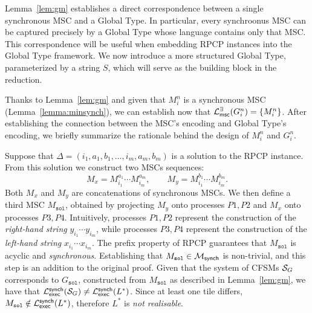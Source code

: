 Lemma~\ref{lem:gm} establishes a direct correspondence between a  
single synchronous MSC and a Global Type. In particular, every  
synchroonus MSC can be captured precisely by a Global Type whose  
language contains only that MSC. This correspondence will be useful  
when embedding RPCP instances into the Global Type framework.
We now introduce a more structured Global Type, parameterized by a  
string $S$, which will serve as the building block in the reduction.

Thanks to Lemma~\ref{lem:gm} and given that $M_i^n$
is a synchronous MSC (Lemma~\ref{lemma:minsynch}), 
we can establish now that 
$\mathcal{L}_{\mathsf{msc}}^{\exists}(G_i^n) =\{M_i^n\}$.
After establishing the connection between the MSC's encoding and
Global Type's encoding,
we briefly summarize the rationale behind the design of $M_i^n$ and $G_i^n$.

Suppose that $\Delta=(i_1,a_1,b_1,\ldots,i_m,a_m,b_m)$ is a  
solution to the RPCP instance. From this solution we construct   
two MSCs sequences:
\[
M_x = M^{a_1}_{i_1}\cdots M^{a_m}_{i_m}, \qquad  
M_y = M^{b_1}_{i_1}\cdots M^{b_m}_{i_m}.
\]
Both $M_x$ and $M_y$ are concatenations of synchronous  
MSCs. We then define a third MSC $M_{\texttt{sol}}$, obtained by  
projecting $M_y$ onto processes $P1,P2$ and $M_x$ onto processes  
$P3,P4$. Intuitively, processes $P1,P2$ represent the construction of  
the \emph{right-hand string} $y_{i_1}\cdots y_{i_m}$, while processes  
$P3,P4$ represent the construction of the \emph{left-hand string}  
$x_{i_1}\cdots x_{i_m}$. The prefix property of RPCP guarantees that  
$M_{\texttt{sol}}$ is acyclic and \emph{synchronous}. Establishing that 
$M_{\texttt{sol}} \in \mathcal{M}_{\mathsf{synch}}$ is non-trivial, and this 
step is an addition to the original proof. 
Given that the system of CFSMs $\mathcal{S}_G$ corresponds to 
$G_{\texttt{sol}}$, constructed from $M_{\texttt{sol}}$ as described in 
Lemma~\ref{lem:gm}, we have that 
$\mathcal{L}_{\mathsf{exec}}^{\mathsf{synch}}(\mathcal{S}_G) \neq 
\mathcal{L}_{\mathsf{exec}}^{\mathsf{synch}}(L^*)$.  
Since at least one tile differs, 
$M_{\texttt{sol}} \notin \mathcal{L}_{\mathsf{exec}}^{\mathsf{synch}}(L^*)$, therefore 
$L^*$ is \emph{not realisable}.




